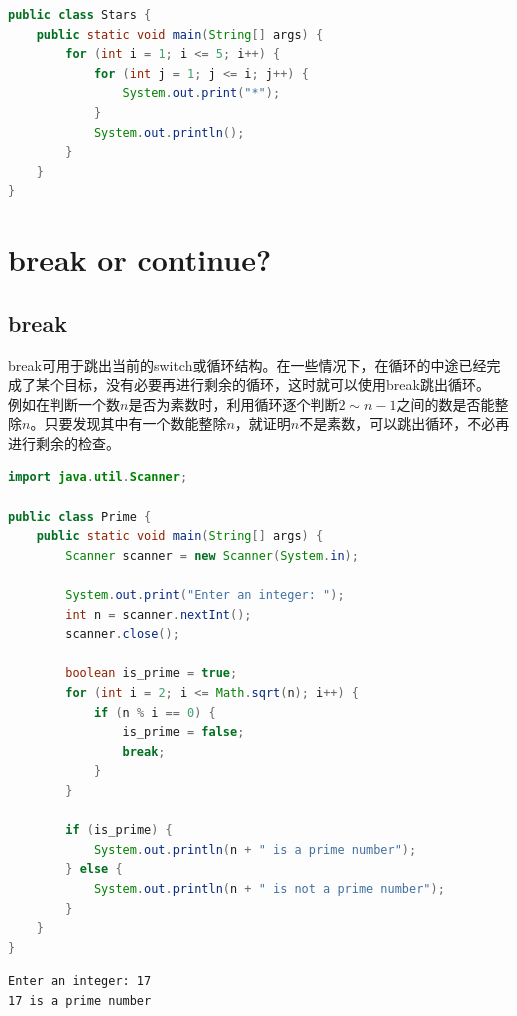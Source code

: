 \begin{lstlisting}[language=Java]
public class Stars {
    public static void main(String[] args) {
        for (int i = 1; i <= 5; i++) {
            for (int j = 1; j <= i; j++) {
                System.out.print("*");
            }
            System.out.println();
        }
    }
}
\end{lstlisting}

\newpage

\section{break or continue?}

\subsection{break}

break可用于跳出当前的switch或循环结构。在一些情况下，在循环的中途已经完成了某个目标，没有必要再进行剩余的循环，这时就可以使用break跳出循环。\\

例如在判断一个数$ n $是否为素数时，利用循环逐个判断$ 2 \sim n - 1 $之间的数是否能整除$ n $。只要发现其中有一个数能整除$ n $，就证明$ n $不是素数，可以跳出循环，不必再进行剩余的检查。\\


\begin{lstlisting}[language=Java]
import java.util.Scanner;

public class Prime {
    public static void main(String[] args) {
        Scanner scanner = new Scanner(System.in);

        System.out.print("Enter an integer: ");
        int n = scanner.nextInt();
        scanner.close();

        boolean is_prime = true;
        for (int i = 2; i <= Math.sqrt(n); i++) {
            if (n % i == 0) {
                is_prime = false;
                break;
            }
        }

        if (is_prime) {
            System.out.println(n + " is a prime number");
        } else {
            System.out.println(n + " is not a prime number");
        }
    }
}
\end{lstlisting}

\begin{tcolorbox}
    \begin{verbatim}
Enter an integer: 17
17 is a prime number
\end{verbatim}
\end{tcolorbox}

